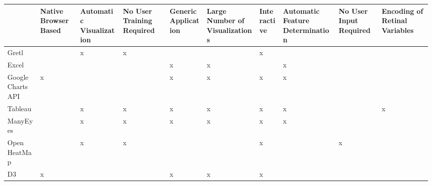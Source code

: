 \documentclass[a4paper, 11pt, titlepage, onehalfspacing]{report}
\begin{document}
    \begin{sidewaystable}
    \small
    \begin{tabularx}{\textwidth}{>{\centering}X|>{\centering}X|>{\centering}X|>{\centering}X|>{\centering}X|>{\centering}X|>{\centering}X|>{\centering}X|>{\centering}X|>{\centering\arraybackslash}X}
    ~                 & Native Browser Based & Automatic Visualization & No User Training Required & Generic Application & Large Number of Visualizations & Interactive & Automatic Feature Determination & No User Input Required & Encoding of Retinal Variables \\ \hline
    Gretl             & ~                    & x                       & x                         & ~                   & ~                              & x           & ~                               & ~                      & ~                             \\ \hline
    Excel             & ~                    & ~                       & ~                         & x                   & x                              & ~           & x                               & ~                      & ~                             \\ \hline
    Google Charts API & x                    & ~                       & ~                         & x                   & x                              & x           & x                               & ~                      & ~                             \\ \hline
    Tableau           & ~                    & x                       & x                         & x                   & x                              & x           & x                               & ~                      & x                             \\ \hline
    ManyEyes          & ~                    & x                       & x                         & x                   & x                              & x           & x                               & ~                      & ~                             \\ \hline
    Open HeatMap       & ~                    & x                       & x                         & ~                   & ~                              & x           & ~                               & x                      & ~                             \\ \hline
    D3                & x                    & ~                       & ~                         & x                   & x                              & x           & ~                               & ~                      & ~                             \\ \hline

\end{tabularx}
\end{sidewaystable}
\end{document}
